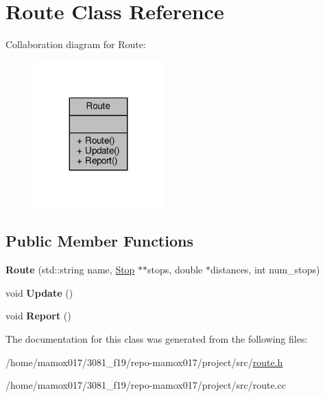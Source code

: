 \hypertarget{classRoute}{}\section{Route Class Reference}
\label{classRoute}


Collaboration diagram for Route\+:
\nopagebreak
\begin{figure}[H]
\begin{center}
\leavevmode
\includegraphics[width=143pt]{classRoute__coll__graph}
\end{center}
\end{figure}
\subsection*{Public Member Functions}
\begin{DoxyCompactItemize}
\item 
\mbox{\label{classRoute_a10f76d08631603cafdc7561522b2f436}} 
{\bfseries Route} (std\+::string name, \hyperlink{classStop}{Stop} $\ast$$\ast$stops, double $\ast$distances, int num\+\_\+stops)
\item 
\mbox{\label{classRoute_a7ecf1d4200f5fe110de4a1d9ea9408c3}} 
void {\bfseries Update} ()
\item 
\mbox{\label{classRoute_a73b08f4521e0cd74c62cf748ee245db4}} 
void {\bfseries Report} ()
\end{DoxyCompactItemize}


The documentation for this class was generated from the following files\+:\begin{DoxyCompactItemize}
\item 
/home/mamox017/3081\+\_\+f19/repo-\/mamox017/project/src/\hyperlink{route_8h}{route.\+h}\item 
/home/mamox017/3081\+\_\+f19/repo-\/mamox017/project/src/route.\+cc\end{DoxyCompactItemize}
